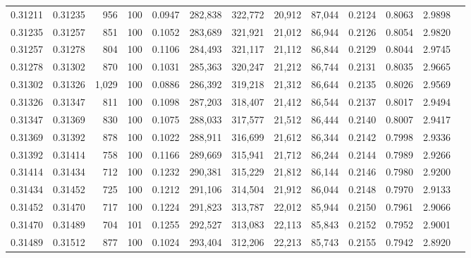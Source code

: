 \begin{tabular}{rrrrrrrrrrrrr}
0.31211 & 0.31235 &   956 & 100 &                                     0.0947 & 282,838 & 322,772 &  20,912 &  87,044 & 0.2124 & 0.8063 & 2.9898 \\
0.31235 & 0.31257 &   851 & 100 &                                     0.1052 & 283,689 & 321,921 &  21,012 &  86,944 & 0.2126 & 0.8054 & 2.9820 \\
0.31257 & 0.31278 &   804 & 100 &                                     0.1106 & 284,493 & 321,117 &  21,112 &  86,844 & 0.2129 & 0.8044 & 2.9745 \\
0.31278 & 0.31302 &   870 & 100 &                                     0.1031 & 285,363 & 320,247 &  21,212 &  86,744 & 0.2131 & 0.8035 & 2.9665 \\
0.31302 & 0.31326 & 1,029 & 100 &                                     0.0886 & 286,392 & 319,218 &  21,312 &  86,644 & 0.2135 & 0.8026 & 2.9569 \\
0.31326 & 0.31347 &   811 & 100 &                                     0.1098 & 287,203 & 318,407 &  21,412 &  86,544 & 0.2137 & 0.8017 & 2.9494 \\
0.31347 & 0.31369 &   830 & 100 &                                     0.1075 & 288,033 & 317,577 &  21,512 &  86,444 & 0.2140 & 0.8007 & 2.9417 \\
0.31369 & 0.31392 &   878 & 100 &                                     0.1022 & 288,911 & 316,699 &  21,612 &  86,344 & 0.2142 & 0.7998 & 2.9336 \\
0.31392 & 0.31414 &   758 & 100 &                                     0.1166 & 289,669 & 315,941 &  21,712 &  86,244 & 0.2144 & 0.7989 & 2.9266 \\
0.31414 & 0.31434 &   712 & 100 &                                     0.1232 & 290,381 & 315,229 &  21,812 &  86,144 & 0.2146 & 0.7980 & 2.9200 \\
0.31434 & 0.31452 &   725 & 100 &                                     0.1212 & 291,106 & 314,504 &  21,912 &  86,044 & 0.2148 & 0.7970 & 2.9133 \\
0.31452 & 0.31470 &   717 & 100 &                                     0.1224 & 291,823 & 313,787 &  22,012 &  85,944 & 0.2150 & 0.7961 & 2.9066 \\
0.31470 & 0.31489 &   704 & 101 &                                     0.1255 & 292,527 & 313,083 &  22,113 &  85,843 & 0.2152 & 0.7952 & 2.9001 \\
0.31489 & 0.31512 &   877 & 100 &                                     0.1024 & 293,404 & 312,206 &  22,213 &  85,743 & 0.2155 & 0.7942 & 2.8920 \\

\end{tabular}

